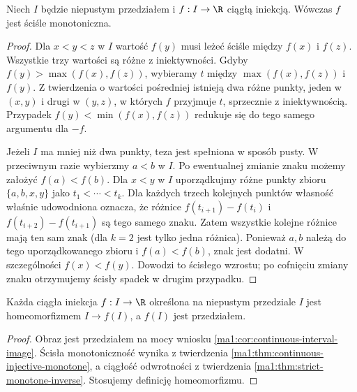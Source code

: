 \begin{twierdzenie}
\label{ma1:thm:continuous-injective-monotone}
Niech $I$ będzie niepustym przedziałem i $f:I\to\R$ ciągłą iniekcją. Wówczas $f$ jest ściśle monotoniczna.
\end{twierdzenie}
\begin{proof}
Dla $x<y<z$ w $I$ wartość $f(y)$ musi leżeć ściśle między $f(x)$ i $f(z)$. Wszystkie trzy wartości są różne z iniektywności. Gdyby $f(y)>\max(f(x),f(z))$, wybieramy $t$ między $\max(f(x),f(z))$ i $f(y)$. Z twierdzenia o wartości pośredniej istnieją dwa różne punkty, jeden w $(x,y)$ i drugi w $(y,z)$, w których $f$ przyjmuje $t$, sprzecznie z iniektywnością. Przypadek $f(y)<\min(f(x),f(z))$ redukuje się do tego samego argumentu dla $-f$.

Jeżeli $I$ ma mniej niż dwa punkty, teza jest spełniona w sposób pusty. W przeciwnym razie wybierzmy $a<b$ w $I$. Po ewentualnej zmianie znaku możemy założyć $f(a)<f(b)$. Dla $x<y$ w $I$ uporządkujmy różne punkty zbioru $\{a,b,x,y\}$ jako $t_1<\cdots<t_k$. Dla każdych trzech kolejnych punktów własność właśnie udowodniona oznacza, że różnice $f(t_{i+1})-f(t_i)$ i $f(t_{i+2})-f(t_{i+1})$ są tego samego znaku. Zatem wszystkie kolejne różnice mają ten sam znak (dla $k=2$ jest tylko jedna różnica). Ponieważ $a,b$ należą do tego uporządkowanego zbioru i $f(a)<f(b)$, znak jest dodatni. W szczególności $f(x)<f(y)$. Dowodzi to ścisłego wzrostu; po cofnięciu zmiany znaku otrzymujemy ścisły spadek w drugim przypadku.
\end{proof}

\begin{wniosek}
\label{ma1:cor:monotone-homeomorphism}
Każda ciągła iniekcja $f:I\to\R$ określona na niepustym przedziale $I$ jest homeomorfizmem $I\to f(I)$, a $f(I)$ jest przedziałem.
\end{wniosek}
\begin{proof}
Obraz jest przedziałem na mocy wniosku \ref{ma1:cor:continuous-interval-image}. Ścisła monotoniczność wynika z twierdzenia \ref{ma1:thm:continuous-injective-monotone}, a ciągłość odwrotności z twierdzenia \ref{ma1:thm:strict-monotone-inverse}. Stosujemy definicję homeomorfizmu.
\end{proof}
